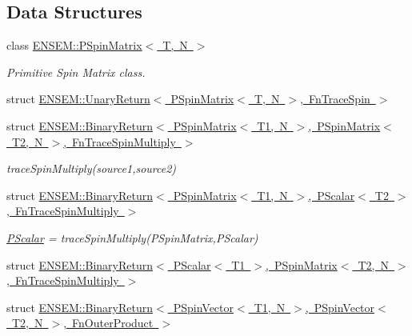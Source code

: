 \subsection*{Data Structures}
\begin{DoxyCompactItemize}
\item 
class \mbox{\hyperlink{classENSEM_1_1PSpinMatrix}{E\+N\+S\+E\+M\+::\+P\+Spin\+Matrix$<$ T, N $>$}}
\begin{DoxyCompactList}\small\item\em Primitive Spin Matrix class. \end{DoxyCompactList}\item 
struct \mbox{\hyperlink{structENSEM_1_1UnaryReturn_3_01PSpinMatrix_3_01T_00_01N_01_4_00_01FnTraceSpin_01_4}{E\+N\+S\+E\+M\+::\+Unary\+Return$<$ P\+Spin\+Matrix$<$ T, N $>$, Fn\+Trace\+Spin $>$}}
\item 
struct \mbox{\hyperlink{structENSEM_1_1BinaryReturn_3_01PSpinMatrix_3_01T1_00_01N_01_4_00_01PSpinMatrix_3_01T2_00_01N_01fe1ad0c4fbb2ea3b6d703682cfed6045}{E\+N\+S\+E\+M\+::\+Binary\+Return$<$ P\+Spin\+Matrix$<$ T1, N $>$, P\+Spin\+Matrix$<$ T2, N $>$, Fn\+Trace\+Spin\+Multiply $>$}}
\begin{DoxyCompactList}\small\item\em trace\+Spin\+Multiply(source1,source2) \end{DoxyCompactList}\item 
struct \mbox{\hyperlink{structENSEM_1_1BinaryReturn_3_01PSpinMatrix_3_01T1_00_01N_01_4_00_01PScalar_3_01T2_01_4_00_01FnTraceSpinMultiply_01_4}{E\+N\+S\+E\+M\+::\+Binary\+Return$<$ P\+Spin\+Matrix$<$ T1, N $>$, P\+Scalar$<$ T2 $>$, Fn\+Trace\+Spin\+Multiply $>$}}
\begin{DoxyCompactList}\small\item\em \mbox{\hyperlink{classENSEM_1_1PScalar}{P\+Scalar}} = trace\+Spin\+Multiply(\+P\+Spin\+Matrix,\+P\+Scalar) \end{DoxyCompactList}\item 
struct \mbox{\hyperlink{structENSEM_1_1BinaryReturn_3_01PScalar_3_01T1_01_4_00_01PSpinMatrix_3_01T2_00_01N_01_4_00_01FnTraceSpinMultiply_01_4}{E\+N\+S\+E\+M\+::\+Binary\+Return$<$ P\+Scalar$<$ T1 $>$, P\+Spin\+Matrix$<$ T2, N $>$, Fn\+Trace\+Spin\+Multiply $>$}}
\item 
struct \mbox{\hyperlink{structENSEM_1_1BinaryReturn_3_01PSpinVector_3_01T1_00_01N_01_4_00_01PSpinVector_3_01T2_00_01N_01_4_00_01FnOuterProduct_01_4}{E\+N\+S\+E\+M\+::\+Binary\+Return$<$ P\+Spin\+Vector$<$ T1, N $>$, P\+Spin\+Vector$<$ T2, N $>$, Fn\+Outer\+Product $>$}}

\end{DoxyCompactItemize}
